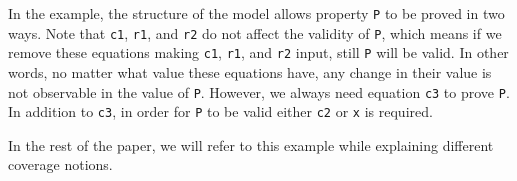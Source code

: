 In the example, the structure of the model allows property {\tt P} to be proved in two ways.
Note that {\tt c1}, {\tt r1}, and {\tt r2} do not affect the validity of {\tt P}, which means
if we remove these equations making {\tt c1}, {\tt r1}, and {\tt r2} input, still {\tt P} will be valid.
In other words, no matter what value these equations have, any change in their value is not observable in the value of {\tt P}.
However, we always need equation {\tt c3} to prove {\tt P}. In addition to {\tt c3}, in order for {\tt P} to be valid either {\tt c2} or {\tt x} is required.

In the rest of the paper, we will refer to this example while explaining different coverage notions.



